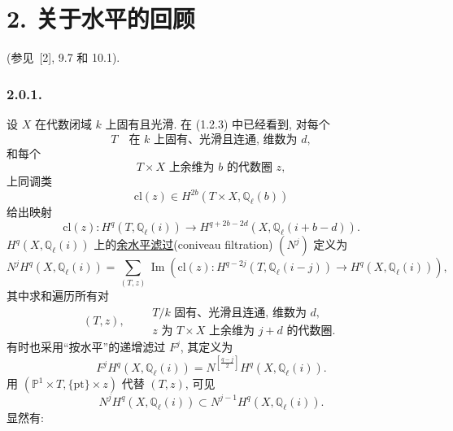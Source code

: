 \section*{2. 关于水平的回顾}
\noindent(参见~[2], 9.7 和 10.1).

\subsubsection*{2.0.1.}
设 $X$ 在代数闭域 $k$ 上固有且光滑. 在 (1.2.3) 中已经看到, 对每个
\begin{equation}\tag{2.0.2}
T\quad\text{在 $k$ 上固有、光滑且连通, 维数为 $d$},
\end{equation}
和每个
\begin{equation}\tag{2.0.3}
\text{$T\times X$ 上余维为 $b$ 的代数圈 $z$},
\end{equation}
上同调类
\begin{equation}\tag{2.0.4}
\mathrm{cl}(z)\in H^{2b}(T\times X,\mathbb Q_\ell(b))
\end{equation}
给出映射
\begin{equation}\tag{2.0.5}
\mathrm{cl}(z):H^q(T,\mathbb Q_\ell(i))\longrightarrow
H^{q+2b-2d}(X,\mathbb Q_\ell(i+b-d)).
\end{equation}
$H^q(X,\mathbb Q_\ell(i))$ 上的\underline{余水平滤过}(coniveau filtration) $(N^j)$ 定义为
\begin{equation}\tag{2.0.6}
N^jH^q(X,\mathbb Q_\ell(i))
=\sum_{(T,z)}\operatorname{Im}\!\left(
\mathrm{cl}(z):H^{q-2j}(T,\mathbb Q_\ell(i-j))
\longrightarrow H^q(X,\mathbb Q_\ell(i))\right),
\end{equation}
其中求和遍历所有对
\begin{equation}\tag{2.0.7}
(T,z),\qquad
\begin{array}{l}
T/k\text{ 固有、光滑且连通, 维数为 }d,\\
z\text{ 为 }T\times X\text{ 上余维为 }j+d\text{ 的代数圈}.
\end{array}
\end{equation}
有时也采用``按水平''的递增滤过 $F^j$, 其定义为
\begin{equation}\tag{2.0.8}
F^jH^q(X,\mathbb Q_\ell(i))
=N^{\left[\frac{q-j}{2}\right]}H^q(X,\mathbb Q_\ell(i)).
\end{equation}
用 $(\mathbb P^1\times T,\{\mathrm{pt}\}\times z)$ 代替 $(T,z)$, 可见
\begin{equation}\tag{2.0.9}
N^jH^q(X,\mathbb Q_\ell(i))
\subset N^{j-1}H^q(X,\mathbb Q_\ell(i)).
\end{equation}
显然有:

